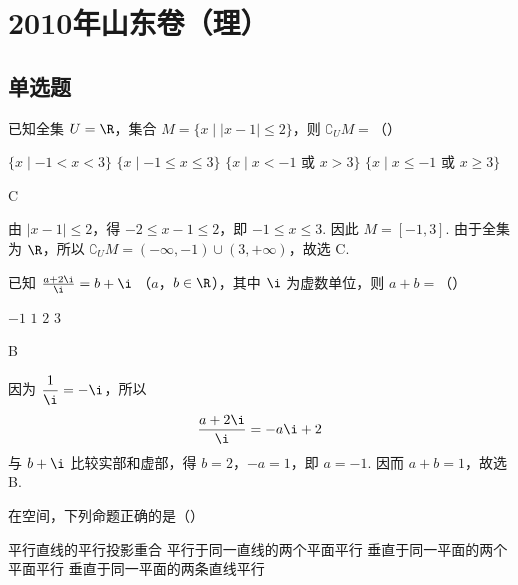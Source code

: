 \chapter{2010年山东卷（理）}

\section{单选题}

\begin{problem}
已知全集 \(U = \R\)，集合 \(M = \{x \mid |x - 1| \leqslant 2\}\)，则 \(\complement_U M =\)（\quad）

\choices
    {\( \{x \mid -1 < x < 3\} \)}
    {\(\{x\mid -1\leqslant x\leqslant 3\}\)}
    {\(\{x \mid x < -1\text{ 或 }x > 3\}\)}
    {\(\{x\mid x\leqslant -1\text{ 或 }x\geqslant 3\}\)}
\end{problem}

\begin{answer}
C
\end{answer}

\begin{solution}
由 \(|x-1|\leqslant2\)，得 \(-2\leqslant x-1\leqslant2\)，即 \(-1\leqslant x\leqslant3\). 因此 \(M=[-1,3]\). 由于全集为 \(\R\)，所以 \(\complement_U M=(-\infty,-1)\cup(3,+\infty)\)，故选 C.
\end{solution}

\begin{problem}
已知 \(\frac{a + 2\i}{\i} = b + \i\) （\(a\)，\(b \in \R\)），其中 \(\i\) 为虚数单位，则 \(a + b =\)（\quad）

\choices
    {\(-1\)}
    {\(1\)}
    {\(2\)}
    {\(3\)}
\end{problem}

\begin{answer}
B
\end{answer}

\begin{solution}
因为 \(\dfrac{1}{\i}=-\i\)，所以
\[
\frac{a+2\i}{\i}=-a\i+2
\]
与 \(b+\i\) 比较实部和虚部，得 \(b=2\)，\(-a=1\)，即 \(a=-1\). 因而 \(a+b=1\)，故选 B.
\end{solution}

\begin{problem}
在空间，下列命题正确的是（\quad）

\choices
    {平行直线的平行投影重合}
    {平行于同一直线的两个平面平行}
    {垂直于同一平面的两个平面平行}
    {垂直于同一平面的两条直线平行}
\end{problem}

